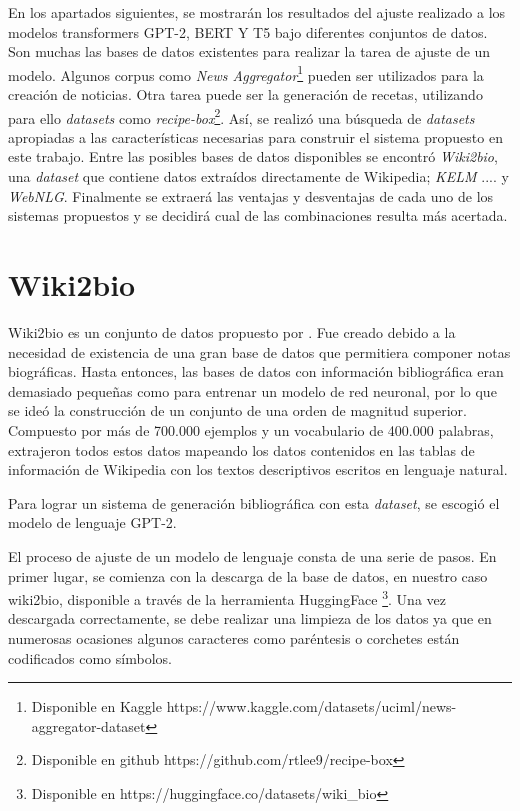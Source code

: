 En los apartados siguientes, se mostrarán los resultados del ajuste realizado a los modelos transformers GPT-2, BERT Y T5 bajo diferentes conjuntos de datos. Son muchas las bases de datos existentes para realizar la tarea de ajuste de un modelo. Algunos corpus como \textit{News Aggregator}\footnote{Disponible en Kaggle https://www.kaggle.com/datasets/uciml/news-aggregator-dataset} pueden ser utilizados para la creación de noticias. Otra tarea puede ser la generación de recetas, utilizando para ello \textit{datasets} como \textit{recipe-box}\footnote{Disponible en github https://github.com/rtlee9/recipe-box}.
Así, se realizó una búsqueda de \textit{datasets} apropiadas a las características necesarias para construir el sistema propuesto en este trabajo. Entre las posibles bases de datos disponibles se encontró \textit{Wiki2bio}, una \textit{dataset} que contiene datos extraídos directamente de Wikipedia; \textit{KELM} .... y \textit{WebNLG}.
Finalmente se extraerá las ventajas y desventajas de cada uno de los sistemas propuestos y se decidirá cual de las combinaciones resulta más acertada.


\section{Wiki2bio}

Wiki2bio es un conjunto de datos propuesto por \citep{lebret-etal-2016-neural}. Fue creado debido a la necesidad de existencia de una gran base de datos que permitiera componer notas biográficas. Hasta entonces, las bases de datos con información bibliográfica eran demasiado pequeñas como para entrenar un modelo de red neuronal, por lo que se ideó la construcción de un conjunto de una orden de magnitud superior. Compuesto por más de 700.000 ejemplos y un vocabulario de 400.000 palabras, extrajeron todos estos datos mapeando los datos contenidos en las tablas de información de Wikipedia con los textos descriptivos escritos en lenguaje natural.

Para lograr un sistema de generación bibliográfica con esta \textit{dataset}, se escogió el modelo de lenguaje GPT-2. 

El proceso de ajuste de un modelo de lenguaje consta de una serie de pasos. En primer lugar, se comienza con la descarga de la base de datos, en nuestro caso wiki2bio, disponible a través de la herramienta HuggingFace \footnote{Disponible en https://huggingface.co/datasets/wiki\_bio}. Una vez descargada correctamente, se debe realizar una limpieza de los datos ya que en numerosas ocasiones algunos caracteres como paréntesis o corchetes están codificados como símbolos. 

